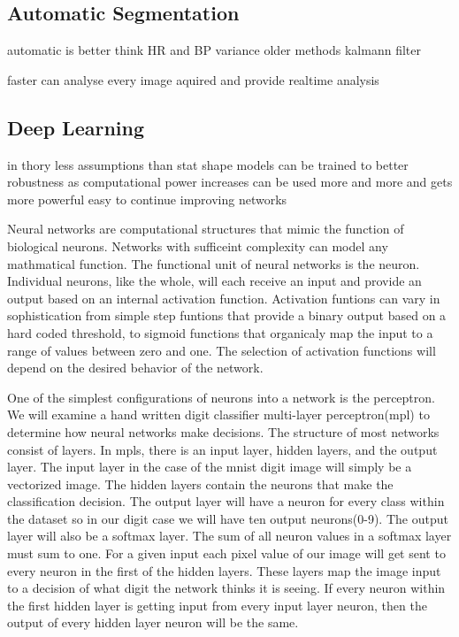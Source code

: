 \documentclass[12pt]{article}
\begin{document}
\subsection{Automatic Segmentation}
automatic is better think HR and BP
variance
older methods
kalmann filter

faster
can analyse every image aquired and provide realtime analysis
\subsection{Deep Learning}
in thory less assumptions than stat shape models
can be trained to better robustness
as computational power increases can be used more and more and gets more powerful
easy to continue improving networks
\par %
Neural networks are computational structures that mimic the function of biological neurons. Networks with sufficeint complexity can model any mathmatical function. 
The functional unit of neural networks is the neuron.
Individual neurons, like the whole, will each receive an input and provide an output based on an internal activation function.
Activation funtions can vary in sophistication from simple step funtions that provide a binary output based on a hard coded threshold,
to sigmoid functions that organicaly map the input to a range of values between zero and one.
The selection of activation functions will depend on the desired behavior of the network. 
\par
One of the simplest configurations of neurons into a network is the perceptron.
We will examine a hand written digit classifier multi-layer perceptron(mpl) to determine how neural networks make decisions.
The structure of most networks consist of layers. In mpls, there is an input layer, hidden layers, and the output layer. 
The input layer in the case of the mnist digit image will simply be a vectorized image. The hidden layers contain the neurons that make the classification decision.
The output layer will have a neuron for every class within the dataset so in our digit case we will have ten output neurons(0-9). The output layer will also be a softmax layer. 
The sum of all neuron values in a softmax layer must sum to one.
For a given input each pixel value of our image will get sent to every neuron in the first of the hidden layers.
These layers map the image input to a decision of what digit the network thinks it is seeing.
If every neuron within the first hidden layer is getting input from every input layer neuron, then the output of every hidden layer neuron will be the same. 
\end{document}
